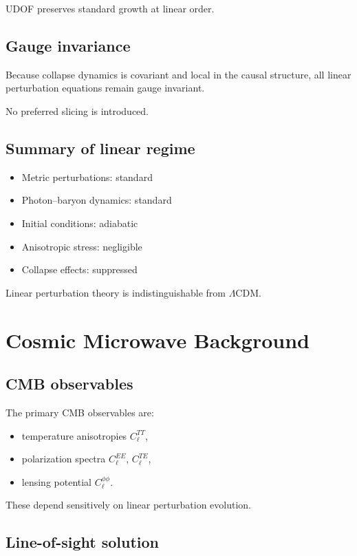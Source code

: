 \documentclass[11pt]{book}
\begin{document}
UDOF preserves standard growth at linear order.

\section{Gauge invariance}

Because collapse dynamics is covariant and local in the causal structure,
all linear perturbation equations remain gauge invariant.

No preferred slicing is introduced.

\section{Summary of linear regime}

\begin{itemize}
\item Metric perturbations: standard
\item Photon--baryon dynamics: standard
\item Initial conditions: adiabatic
\item Anisotropic stress: negligible
\item Collapse effects: suppressed
\end{itemize}

Linear perturbation theory is indistinguishable from $\Lambda$CDM.

\chapter{Cosmic Microwave Background}

\section{CMB observables}

The primary CMB observables are:
\begin{itemize}
\item temperature anisotropies $C_\ell^{TT}$,
\item polarization spectra $C_\ell^{EE}$, $C_\ell^{TE}$,
\item lensing potential $C_\ell^{\phi\phi}$.
\end{itemize}

These depend sensitively on linear perturbation evolution.

\section{Line-of-sight solution}
\end{document}
